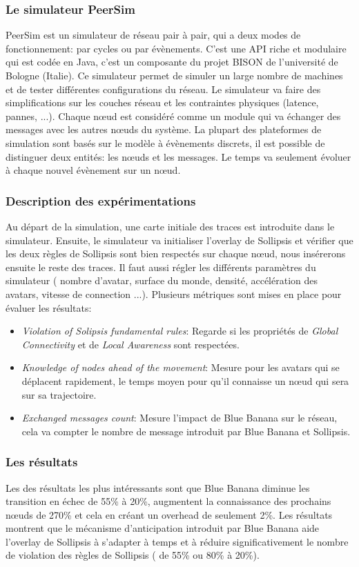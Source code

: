 		\subsubsection{Le simulateur PeerSim}
		PeerSim est un simulateur de réseau pair à pair, qui a deux modes de fonctionnement: par cycles ou par évènements. C'est une API riche et modulaire qui est codée en Java, c'est un composante du projet BISON de l'université de Bologne (Italie). Ce simulateur permet de simuler un large nombre de machines et de tester différentes configurations du réseau. Le simulateur va faire des simplifications sur les couches réseau et les contraintes physiques (latence, pannes, ...). Chaque nœud est considéré comme un module qui va échanger des messages avec les autres nœuds du système. La plupart des plateformes de simulation sont basés sur le modèle à évènements discrets, il est possible de distinguer deux entités: les nœuds et les messages. Le temps va seulement évoluer à chaque nouvel évènement sur un nœud.
		\subsubsection{Description des expérimentations}
		Au départ de la simulation, une carte initiale des traces est introduite dans le simulateur. Ensuite, le simulateur va initialiser l'overlay de Sollipsis et vérifier que les deux règles de Sollipsis sont bien respectés sur chaque nœud, nous insérerons ensuite le reste des traces. Il faut aussi régler les différents paramètres du simulateur ( nombre d'avatar, surface du monde, densité, accélération des avatars, vitesse de connection ...). Plusieurs métriques sont mises en place pour évaluer les résultats:
	\begin{itemize}
	\renewcommand{\labelitemi}{$\bullet$}
		\item \textit{Violation of Solipsis fundamental rules}: Regarde si les propriétés de \textit{Global Connectivity} et de \textit{Local Awareness} sont respectées.
		\item \textit{Knowledge of nodes ahead of the movement}: Mesure pour les avatars qui se déplacent rapidement, le temps moyen pour qu'il connaisse un nœud qui sera sur sa trajectoire.
		\item \textit{Exchanged messages count}: Mesure l'impact de Blue Banana sur le réseau, cela va compter le nombre de message introduit par Blue Banana et Sollipsis.
	\end{itemize}
		\subsubsection{Les résultats}
		Les des résultats les plus intéressants sont que Blue Banana diminue les transition en échec de 55\% à 20\%, augmentent la connaissance des prochains nœuds de 270\% et cela en créant un overhead de seulement 2\%. Les résultats montrent que le mécanisme d'anticipation introduit par Blue Banana aide l'overlay de Sollipsis à s'adapter à temps et à réduire significativement le nombre de violation des règles de Sollipsis ( de 55\% ou 80\% à 20\%). 
